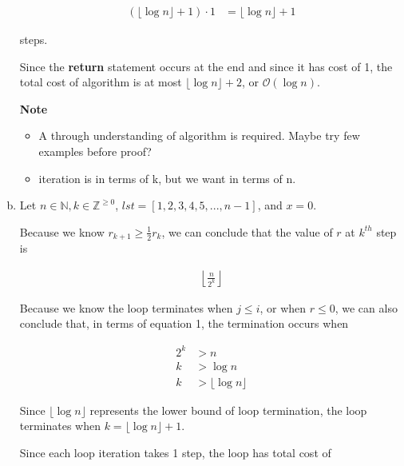 \documentclass[12pt]{article}
\begin{document}
\begin{enumerate}[a.]
    \begin{align}
        (\lfloor \log n \rfloor + 1) \cdot 1 &= \lfloor \log n \rfloor + 1
    \end{align}

    steps.

    \bigskip

    Since the \textbf{return} statement occurs at the end and since it has cost of 1,
    the total cost of algorithm is at most $\lfloor \log n \rfloor + 2$, or $\mathcal{O}(\log n)$.

    \textbf{Note}

    \begin{itemize}
        \item A through understanding of algorithm is required. Maybe try few examples before proof?
        \item iteration is in terms of k, but we want in terms of n.
    \end{itemize}


    \item

    Let $n \in \mathbb{N}, k \in \mathbb{Z}^{\geq 0}$, $lst=[1,2,3,4,5,...,n-1]$,
    and $x = 0$.

    \bigskip

    Because we know $r_{k+1} \geq \frac{1}{2}r_k$, we can conclude that the value
    of $r$ at $k^{th}$ step is

    \setcounter{equation}{0}
    \begin{align}
        \left\lfloor \frac{n}{2^k} \right\rfloor
    \end{align}

    \bigskip

    Because we know the loop terminates when $j \leq i$, or when $r \leq 0$, we
    can also conclude that, in terms of equation 1, the termination occurs when

    \begin{align}
        2^k &> n\\
        k &> \log n\\
        k &> \lfloor \log n \rfloor
    \end{align}

    \bigskip

    Since $\lfloor \log n \rfloor$ represents the lower bound of loop termination, the loop
    terminates when $k = \lfloor \log n \rfloor + 1$.

    \bigskip

    Since each loop iteration takes 1 step, the loop has total cost of


\end{enumerate}
\end{document}
